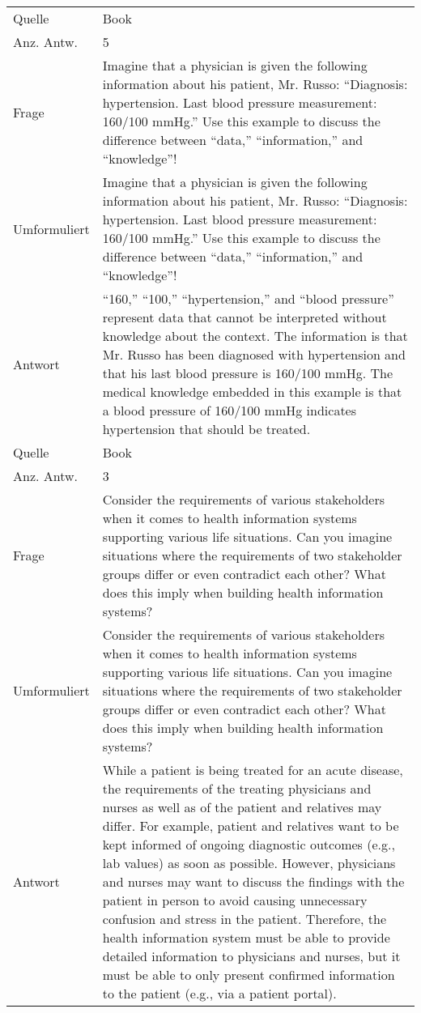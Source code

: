 \begin{landscape}
\begin{longtable}{p{3cm}p{}}
    Quelle & Book \\
    Anz. Antw. & 5 \\
    \midrule
    Frage & Imagine that a physician is given the following information about his patient, Mr. Russo: ``Diagnosis: hypertension.
    Last blood pressure measurement: 160/100 mmHg.'' Use this example to discuss the difference between ``data,'' ``information,'' and ``knowledge''! \\
    Umformuliert & Imagine that a physician is given the following information about his patient, Mr. Russo: ``Diagnosis: hypertension.
    Last blood pressure measurement: 160/100 mmHg.'' Use this example to discuss the difference between ``data,'' ``information,'' and ``knowledge''! \\
    Antwort & ``160,'' ``100,'' ``hypertension,'' and ``blood pressure'' represent data that cannot be interpreted without knowledge about the context.
    The information is that Mr. Russo has been diagnosed with hypertension and that his last blood pressure is 160/100 mmHg.
    The medical knowledge embedded in this example is that a blood pressure of 160/100 mmHg indicates hypertension that should be treated.\\
    Quelle & Book \\
    Anz. Antw. & 3 \\
    \midrule
    Frage & Consider the requirements of various stakeholders when it comes to health information systems supporting various life situations.
    Can you imagine situations where the requirements of two stakeholder groups differ or even contradict each other? What does this imply when building health information systems? \\
    Umformuliert & Consider the requirements of various stakeholders when it comes to health information systems supporting various life situations.
    Can you imagine situations where the requirements of two stakeholder groups differ or even contradict each other? What does this imply when building health information systems? \\
    Antwort & While a patient is being treated for an acute disease, the requirements of the treating physicians and nurses as well as of the patient and relatives may differ.
    For example, patient and relatives want to be kept informed of ongoing diagnostic outcomes (e.g., lab values) as soon as possible.
    However, physicians and nurses may want to discuss the findings with the patient in person to avoid causing unnecessary confusion and stress in the patient.
    Therefore, the health information system must be able to provide detailed information to physicians and nurses, but it must be able to only present confirmed information to the patient (e.g., via a patient portal). \\

\end{longtable}
\end{landscape}
